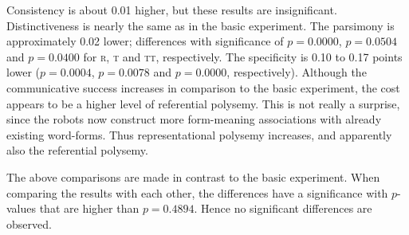 Consistency is about 0.01 higher, but these results are insignificant. Distinctiveness is nearly the same as in the basic experiment. The parsimony is approximately 0.02 lower; differences with significance of $p=0.0000$, $p=0.0504$ and $p=0.0400$ for {\scshape r}, {\scshape t} and {\scshape tt}, respectively. The specificity is 0.10 to 0.17 points lower ($p=0.0004$, $p=0.0078$ and $p=0.0000$, respectively). Although the communicative success increases in comparison to the basic experiment, the cost appears to be a higher level of referential polysemy. This is not really a surprise, since the robots now construct more form-meaning associations with already existing word-forms. Thus representational polysemy increases, and apparently also the referential polysemy.

The above comparisons are made in contrast to the basic experiment. When comparing the results with each other, the differences have a significance with $p$-values that are higher than $p=0.4894$. Hence no significant differences are observed.

